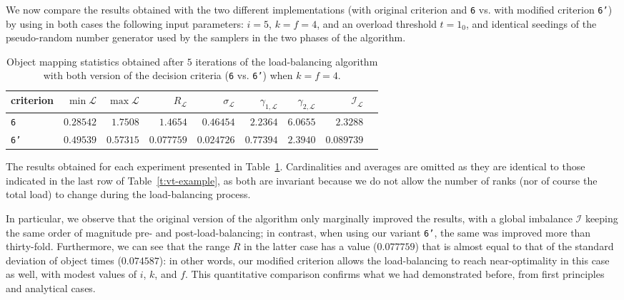 We now compare the results obtained with the two different
implementations (with original criterion and
\texttt{6} vs. with modified criterion \texttt{6'}) by
using in both cases the following input parameters: $i=5$, $k=f=4$,
and an overload threshold $t=1_0$, and identical seedings of the
pseudo-random number generator used by the samplers in the two phases
of the algorithm.

\begin{table}[htb!]
\begin{center}
\begin{tabular}{@{}lrrrrrrrr@{}}
\hline
criterion &
$\min{\mathcal{L}}$ & 
$\max{\mathcal{L}}$ &
$R_{\mathcal{L}}$ &
$\sigma_{\mathcal{L}}$ &
$\gamma_{1,\mathcal{L}}$ &
$\gamma_{2,\mathcal{L}}$ &
$\mathcal{I}_{\mathcal{L}}$ \\
\hline\hline
\texttt{6} &
$0.28542$ & $1.7508$ & $1.4654$ &
$0.46454$ & $2.2364$ & $6.0655$ &
$2.3288$  \\\hline
\texttt{6'} &
$0.49539$  & $0.57315$ & $0.077759$ &
$0.024726$ & $0.77394$ & $2.3940$ &
$0.089739$ \\\hline
\end{tabular}
\end{center}
\caption{\label{t:comparative_results} Object mapping statistics
obtained after $5$ iterations of the load-balancing algorithm with
both version of the decision criteria (\texttt{6} vs. \texttt{6'})
when $k=f=4$.}
\end{table}

The results obtained for each experiment  presented in
Table~\ref{t:comparative_results}. Cardinalities and averages are
omitted as they are identical to those indicated in the last row of
Table~\ref{t:vt-example}, as both are invariant because we do not
allow the number of ranks (nor of course the total load) to change
during the load-balancing process.

In particular, we observe that the original version of the algorithm
only marginally improved the results, with a global imbalance
$\mathcal{I}$ keeping the same order of magnitude pre- and
post-load-balancing; in contrast, when using our variant \texttt{6'}, the
same was improved more than thirty-fold.
Furthermore, we can see that the range $R$ in the latter case has a
value ($0.077759$) that is almost equal to that of the standard
deviation of object times ($0.074587$): in other words, our modified
criterion allows the load-balancing to reach near-optimality in this
case as well, with modest values of $i$, $k$, and $f$.
This quantitative comparison confirms what we had demonstrated before,
from first principles and analytical cases.
 
